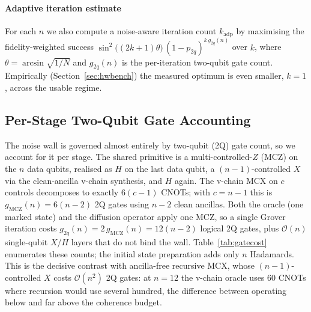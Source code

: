 \documentclass[journal]{IEEEtran}
\newcommand{\bigO}{\mathcal{O}}
\begin{document}
\paragraph{Adaptive iteration estimate}
For each $n$ we also compute a noise-aware iteration count $k_{\mathrm{adp}}$ by
maximising the fidelity-weighted success
$\sin^{2}\!\big((2k{+}1)\theta\big)\,(1{-}p_{2q})^{k\,g_{2q}(n)}$
over $k$, where $\theta=\arcsin\sqrt{1/N}$ and $g_{2q}(n)$ is the per-iteration
two-qubit gate count. Empirically (Section~\ref{sec:hwbench}) the measured
optimum is even smaller, $k{=}1$, across the usable regime.

\subsection{Per-Stage Two-Qubit Gate Accounting}
\label{sec:gatecost}
The noise wall is governed almost entirely by two-qubit (2Q) gate count, so we
account for it per stage. The shared primitive is a multi-controlled-$Z$ (MCZ) on
the $n$ data qubits, realised as $H$ on the last data qubit, a $(n{-}1)$-controlled
$X$ via the clean-ancilla v-chain synthesis, and $H$ again. The v-chain MCX on
$c$ controls decomposes to exactly $6(c{-}1)$ CNOTs; with $c=n{-}1$ this is
$g_{\mathrm{MCZ}}(n)=6(n{-}2)$ 2Q gates using $n{-}2$ clean ancillas. Both the
oracle (one marked state) and the diffusion operator apply one MCZ, so a single
Grover iteration costs $g_{2q}(n)=2\,g_{\mathrm{MCZ}}(n)=12(n{-}2)$ logical 2Q
gates, plus $\bigO(n)$ single-qubit $X$/$H$ layers that do not bind the wall.
Table~\ref{tab:gatecost} enumerates these counts; the initial state preparation
adds only $n$ Hadamards. This is the decisive contrast with ancilla-free
recursive MCX, whose $(n{-}1)$-controlled $X$ costs $\bigO(n^{2})$ 2Q gates: at
$n{=}12$ the v-chain oracle uses $60$ CNOTs where recursion would use several
hundred, the difference between operating below and far above the coherence
budget.
\end{document}
